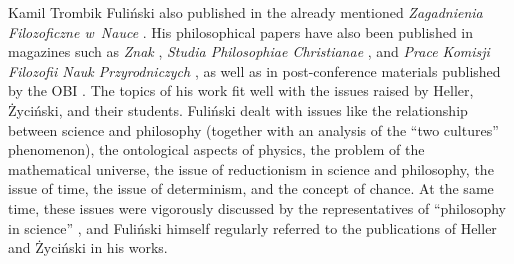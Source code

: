 \begin{artengenv}{Kamil Trombik}
Fuliński also published in the already mentioned \textit{Zagadnienia Filozoficzne w~Nauce} 
\parencites[][]{fulinski_profesor_2015}[][]{fulinski_fluktuujacy_2017}. %
 His philosophical papers have also been published in magazines such as \textit{Znak} 
\parencite[][]{fulinski_o_1993}, %
 \textit{Studia Philosophiae Christianae} 
\parencite[][]{fulinski_maszyna_1989}, %
 and \textit{Prace Komisji Filozofii Nauk Przyrodniczych} 
\parencite[][]{fulinski_czy_2010}, %
 as well as in post-conference materials published by the OBI 
\parencites[e.g][]{janik_glos_1990}[][]{heller_co_1991}[][]{heller_jednosc_2003-2}. %
 The topics of his work fit well with the issues raised by Heller, Życiński, and their students. Fuliński dealt with issues like the relationship between science and philosophy (together with an analysis of the ``two cultures'' phenomenon), the ontological aspects of physics, the problem of the mathematical universe, the issue of reductionism in science and philosophy, the issue of time, the issue of determinism, and the concept of chance. At the same time, these issues were vigorously discussed by the representatives of ``philosophy in science'' 
\parencite[e.g][pp.222–223]{trombik_koncepcje_2021}, %
 and Fuliński himself regularly referred to the publications of Heller and Życiński in his works.




\end{artengenv}
